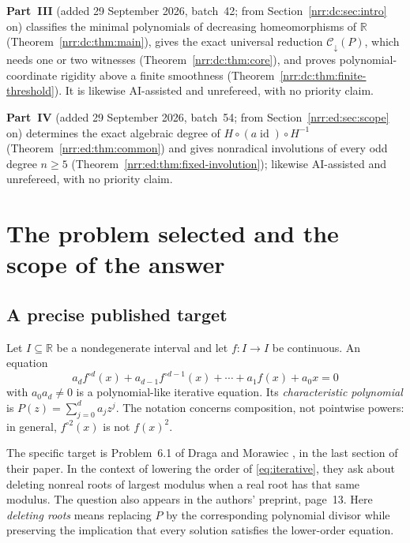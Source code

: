 \documentclass[11pt,letterpaper]{article}
\theoremstyle{definition}
\theoremstyle{remark}
\newcommand{\R}{\mathbb R}
\newcommand{\id}{\operatorname{id}}
\newcommand{\itn}[2]{#1^{\circ #2}}
\newcommand{\dcore}{\mathcal C_{\downarrow}}
\begin{document}
\noindent\textbf{Part~III} (added 29 September 2026, batch~42; from
Section~\ref{nrr:dc:sec:intro} on) classifies the minimal polynomials of
decreasing homeomorphisms of $\R$ (Theorem~\ref{nrr:dc:thm:main}), gives the
exact universal reduction $\dcore(P)$, which needs one or two witnesses
(Theorem~\ref{nrr:dc:thm:core}), and proves polynomial-coordinate rigidity
above a finite smoothness (Theorem~\ref{nrr:dc:thm:finite-threshold}). It is
likewise AI-assisted and unrefereed, with no priority claim.

\noindent\textbf{Part~IV} (added 29 September 2026, batch~54; from
Section~\ref{nrr:ed:sec:scope} on) determines the exact algebraic degree of
$H\circ(a\id)\circ H^{-1}$ (Theorem~\ref{nrr:ed:thm:common}) and gives nonradical
involutions of every odd degree $n\ge5$
(Theorem~\ref{nrr:ed:thm:fixed-involution}); likewise AI-assisted and
unrefereed, with no priority claim.\par
\endgroup

\clearpage
\begingroup
\small
\setlength{\parskip}{0pt}
\tableofcontents
\endgroup
\clearpage

\section{The problem selected and the scope of the answer}
\label{sec:problem}

\subsection{A precise published target}

Let $I\subseteq\R$ be a nondegenerate interval and let
$f:I\to I$ be continuous. An equation
\begin{equation}
  a_d\itn{f}{d}(x)+a_{d-1}\itn{f}{d-1}(x)+\cdots+a_1f(x)+a_0x=0
  \label{eq:iterative}
\end{equation}
with $a_0a_d\ne0$ is a polynomial-like iterative equation. Its
\emph{characteristic polynomial} is $P(z)=\sum_{j=0}^d a_jz^j$.
The notation concerns composition, not pointwise powers: in general,
$\itn{f}{2}(x)$ is not $f(x)^2$.

The specific target is Problem~6.1 of Draga and Morawiec
\cite{DM2016}, in the last section of their paper. In the context of
lowering the order of \eqref{eq:iterative}, they ask about deleting nonreal
roots of largest modulus when a real root has that same modulus. The
question also appears in the authors' preprint, page~13. Here
\emph{deleting roots} means replacing $P$ by the corresponding polynomial
divisor while preserving the implication that every solution satisfies the
lower-order equation.
\end{document}
